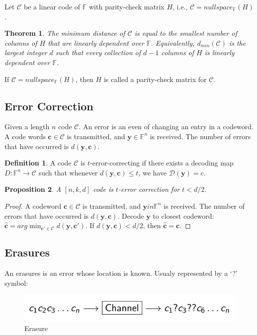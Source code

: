 \documentclass[12pt, oneside]{book}
\newtheorem{theorem}{Theorem}[section]
\newtheorem{proposition}[theorem]{Proposition}
\theoremstyle{definition}
\newtheorem{definition}{Definition}[section]
\theoremstyle{definition}
\theoremstyle{remark}
\begin{document}
Let $\mathcal{C}$ be a linear code of $\mathbb{F}$ with parity-check matrix $H$, i.e., $\mathcal{C}=nullspace_{\mathbb{F}}(H)$.

\begin{theorem}
    The minimum distance of $\mathcal{C}$ is equal to the smallest number of columns of $H$ that are linearly dependent over $\mathbb{F}$. Equivalently, $d_{min}(\mathcal{C})$ is the largest integer $d$ such that every collection of $d-1$ columns of $H$ is linearly dependent over $\mathbb{F}$.
\end{theorem}

If $\mathcal{C}=nullspace_{\mathbb{F}}(H)$, then $H$ is called a parity-check matrix for $\mathcal{C}$.

\subsection{Error Correction}
Given a length $n$ code $\mathcal{C}$. An error is an even of changing an entry in a codeword. A code words $\mathbf{c}\in\mathcal{C}$ is transmitted, and $\mathbf{y}\in\mathbb{F}^n$ is received. The number of errors that have occurred is $d(\mathbf{y},\mathbf{c})$.
\begin{definition}
    A code $\mathcal{C}$ is $t$-error-correcting if there exists a decoding map $ D:\mathbb{F}^n\rightarrow \mathcal{C}$ such that whenever $d(\mathbf{y},\mathbf{c})\leq t$, we have $\mathcal{D}(\mathbf{y})=c$.
\end{definition}

\begin{proposition}
    A $[n,k,d]$ code is $t$-error correction for $t<d/2$.
\end{proposition}
\begin{proof}
    A codeword $\mathbf{c}\in\mathcal{C}$ is transmitted, and $\mathbf{y}in\mathbb{F}^n$ is received. The number of errors that have occurred is $d(\mathbf{y},\mathbf{c})$. Decode $\mathbf{y}$ to closest codeword: $\hat{\mathbf{c}}=arg \min_{\mathbf{c'}\in\mathcal{C}}d(\mathbf{y},\mathbf{c'})$. If $d(\mathbf{y},\mathbf{c})<d/2$, then $\hat{\mathbf{c}}=\mathbf{c}$.
\end{proof}

\subsection{Erasures}
An erasures is an error whose location is known. Usualy represented by a `?' symbol:
\begin{figure}[h]
    \centering
    \includegraphics[width=0.5\linewidth]{../images/erasure.png}
    \caption{Erasure}
\end{figure}
\end{document}
